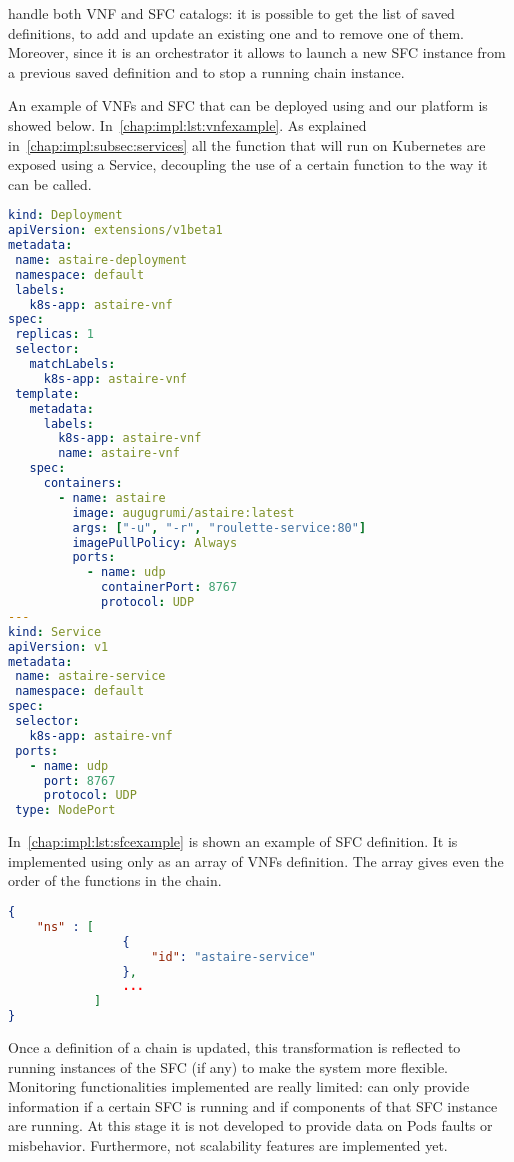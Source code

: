 \harbor{} handle both VNF and SFC catalogs: it is possible to get the list of
saved definitions, to add and update an existing one and to remove one of them.
Moreover, since it is an orchestrator it allows to launch a new SFC instance
from a previous saved definition and to stop a running chain instance.

An example of VNFs and SFC that can be deployed using \harbor{} and our platform
is showed below. In~\ref{chap:impl:lst:vnfexample}. As explained 
in~\ref{chap:impl:subsec:services} all the function that will run on Kubernetes
are exposed using a Service, decoupling the use of a certain function to the way
it can be called.
\begin{lstlisting}[caption={Example of VNF definition}, captionpos=b,
                   language=yaml, label=chap:impl:lst:vnfexample]
kind: Deployment
apiVersion: extensions/v1beta1
metadata:
 name: astaire-deployment
 namespace: default
 labels:
   k8s-app: astaire-vnf
spec:
 replicas: 1
 selector:
   matchLabels:
     k8s-app: astaire-vnf
 template:
   metadata:
     labels:
       k8s-app: astaire-vnf
       name: astaire-vnf
   spec:
     containers:
       - name: astaire
         image: augugrumi/astaire:latest
         args: ["-u", "-r", "roulette-service:80"]
         imagePullPolicy: Always
         ports:
           - name: udp
             containerPort: 8767
             protocol: UDP
---
kind: Service
apiVersion: v1
metadata:
 name: astaire-service
 namespace: default
spec:
 selector:
   k8s-app: astaire-vnf
 ports:
   - name: udp
     port: 8767
     protocol: UDP
 type: NodePort
\end{lstlisting}

In~\ref{chap:impl:lst:sfcexample} is shown an example of SFC definition. It is
implemented using only as an array of VNFs definition. The array gives even the
order of the functions in the chain.
\begin{lstlisting}[caption={Example of SFC definition}, captionpos=b,
                   language=json, label=chap:impl:lst:sfcexample]
{
    "ns" : [
                {
                    "id": "astaire-service"
                },
                ...
            ]
}
\end{lstlisting}

Once a definition of a chain is updated, this transformation is reflected to
running instances of the SFC (if any) to make the system more flexible.
Monitoring functionalities implemented are really limited: \harbor{} can only
provide information if a certain SFC is running and if components of that SFC
instance are running. At this stage it is not developed to provide data on Pods
faults or misbehavior. Furthermore, not scalability features are implemented
yet.


